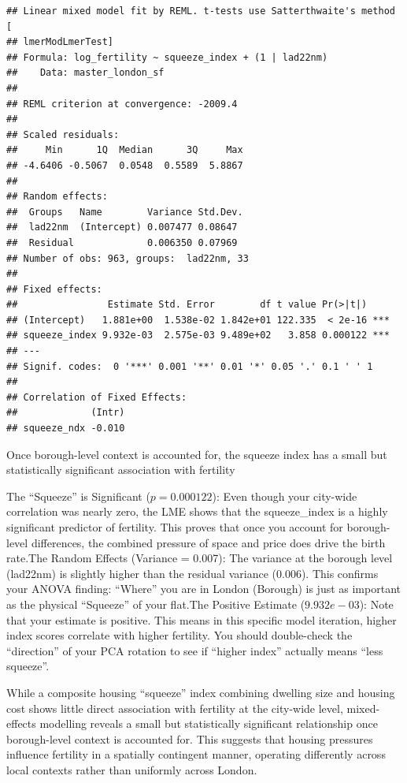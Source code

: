 \documentclass[
]{article}
\begin{document}
\begin{verbatim}
## Linear mixed model fit by REML. t-tests use Satterthwaite's method [
## lmerModLmerTest]
## Formula: log_fertility ~ squeeze_index + (1 | lad22nm)
##    Data: master_london_sf
## 
## REML criterion at convergence: -2009.4
## 
## Scaled residuals: 
##     Min      1Q  Median      3Q     Max 
## -4.6406 -0.5067  0.0548  0.5589  5.8867 
## 
## Random effects:
##  Groups   Name        Variance Std.Dev.
##  lad22nm  (Intercept) 0.007477 0.08647 
##  Residual             0.006350 0.07969 
## Number of obs: 963, groups:  lad22nm, 33
## 
## Fixed effects:
##                Estimate Std. Error        df t value Pr(>|t|)    
## (Intercept)   1.881e+00  1.538e-02 1.842e+01 122.335  < 2e-16 ***
## squeeze_index 9.932e-03  2.575e-03 9.489e+02   3.858 0.000122 ***
## ---
## Signif. codes:  0 '***' 0.001 '**' 0.01 '*' 0.05 '.' 0.1 ' ' 1
## 
## Correlation of Fixed Effects:
##             (Intr)
## squeeze_ndx -0.010
\end{verbatim}

Once borough-level context is accounted for, the squeeze index has a
small but statistically significant association with fertility

The ``Squeeze'' is Significant (\(p = 0.000122\)): Even though your
city-wide correlation was nearly zero, the LME shows that the
squeeze\_index is a highly significant predictor of fertility. This
proves that once you account for borough-level differences, the combined
pressure of space and price does drive the birth rate.The Random Effects
(Variance = 0.007): The variance at the borough level (lad22nm) is
slightly higher than the residual variance (0.006). This confirms your
ANOVA finding: ``Where'' you are in London (Borough) is just as
important as the physical ``Squeeze'' of your flat.The Positive Estimate
(\(9.932e-03\)): Note that your estimate is positive. This means in this
specific model iteration, higher index scores correlate with higher
fertility. You should double-check the ``direction'' of your PCA
rotation to see if ``higher index'' actually means ``less squeeze''.

While a composite housing ``squeeze'' index combining dwelling size and
housing cost shows little direct association with fertility at the
city-wide level, mixed-effects modelling reveals a small but
statistically significant relationship once borough-level context is
accounted for. This suggests that housing pressures influence fertility
in a spatially contingent manner, operating differently across local
contexts rather than uniformly across London.
\end{document}
